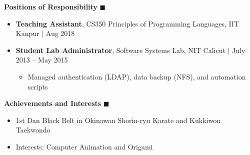 \documentclass[9pt]{extletter}
\begin{document}
\vspace{9pt}
\textbf{\Large Positions of Responsibility} \hrulefill $\blacksquare$
\vspace{-5pt}
\begin{itemize}
    \item \textbf{Teaching Assistant}, CS350 Principles of Programming Languages, IIT Kanpur $|$ Aug 2018
    \item \textbf{Student Lab Administrator}, Software Systems Lab, NIT Calicut $|$ July 2013 -- May 2015
    \begin{itemize}
        \item Managed authentication (LDAP), data backup (NFS), and automation scripts
    \end{itemize}
\end{itemize}
\vspace{-\parskip}

\vspace{9pt}
\textbf{\Large Achievements and Interests} \hrulefill $\blacksquare$
\vspace{-5pt}
\begin{itemize}
    \item 1st Dan Black Belt in Okinawan Shorin-ryu Karate and Kukkiwon Taekwondo
    \item Interests: Computer Animation and Origami
\end{itemize}
\vspace{-\parskip}
\end{document}
